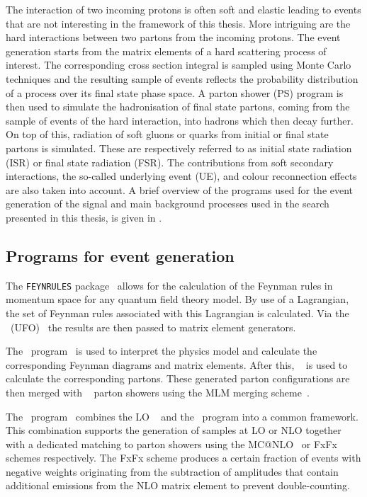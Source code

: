 The interaction of two incoming protons is often soft and elastic leading to events that are not interesting in the framework of this thesis. More intriguing are the hard interactions between two partons from the incoming protons. The event generation starts from the matrix elements of a hard scattering process of interest. The corresponding cross section integral is sampled using Monte Carlo techniques and the resulting sample of events reflects the probability distribution of a process over its final state phase space. A parton shower (PS) program is then used to simulate the hadronisation of final state partons,  coming from the sample of events of the hard interaction, into hadrons which then decay further. On top of this,  radiation of soft gluons or quarks from initial or final state partons is simulated. These are respectively referred to as initial state radiation (ISR) or final state radiation (FSR). The contributions from soft secondary interactions, the so-called underlying event (UE), and colour reconnection effects are also taken into account. 
A brief overview of the programs used for the event generation of the signal and main background processes used in the search presented in this thesis,  is given in .

\subsection{Programs for event generation}
\label{sec:programs}
The \texttt{FEYNRULES} package~\cite{Alloul:2013bka} allows for the calculation of  the Feynman rules in momentum space for any quantum field theory model. By use of a Lagrangian, the set of Feynman rules associated with this Lagrangian is calculated. Via the \UFO\ (UFO)~\cite{Degrande:2011ua} the results are then passed to matrix element generators. 


The \MG\  program~\cite{Alwall:2011uj} is used to interpret the physics model and calculate the corresponding Feynman diagrams and matrix elements. After this, \ME~\cite{Mangano:2006rw} is used to calculate the corresponding partons. These generated parton configurations are then merged with \Pythia~\cite{Sjostrand:2006za,Sjostrand:2014zea} parton showers using the MLM merging scheme~\cite{Alwall:2007fs}. 

The \aMCMG\ program~\cite{Alwall:2014hca} combines the LO \MG~\cite{Alwall:2011uj} and the \aMC\ program into a common framework. This combination supports the generation of samples at LO or NLO together with a dedicated matching to parton showers  using the MC@NLO~\cite{Frixione:2002ik} or FxFx~\cite{Frederix:2012ps} schemes respectively. The FxFx scheme produces a certain fraction of events with negative weights originating from the subtraction of amplitudes that contain additional emissions from the NLO matrix element to prevent double-counting.



